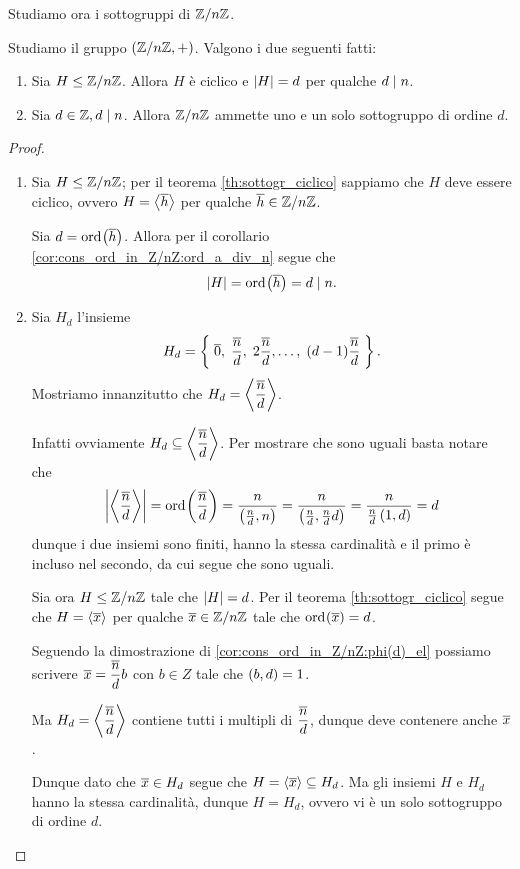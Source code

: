 Studiamo ora i sottogruppi di $\mathbb{Z}/n\mathbb{Z}$.

\begin{proposition}
     \label{prop:sgr_Z/nZ}
    Studiamo il gruppo $(\mathbb{Z}/n\mathbb{Z}, +)$. Valgono i due seguenti fatti:
    \begin{enumerate}[label={(\roman*)}, ref={\theproposition: (\roman*)}]
        \item \label{prop:sgr_Z/nZ:ciclico_ord_d} Sia $H \leq \mathbb{Z}/n\mathbb{Z}$. Allora $H$ è ciclico e $\lvert H\rvert = d$ per qualche $d \mid n$.
        \item \label{prop:sgr_Z/nZ:unosolo_ord_d} Sia $d \in \mathbb{Z}, d \mid n$. Allora $\mathbb{Z}/n\mathbb{Z}$ ammette uno e un solo sottogruppo di ordine $d$.
    \end{enumerate}
\end{proposition}

\begin{proof}
    \begin{enumerate} [label={(\roman*)}]
        \item Sia $H \leq \mathbb{Z}/n\mathbb{Z}$; per il teorema \ref{th:sottogr_ciclico} sappiamo che $H$ deve essere ciclico, ovvero $H = \cycl*{\eqclass h}$ per qualche $\eqclass h \in \Zmod n$.
        
        Sia $d = \ord{\eqclass h}$. Allora per il corollario \ref{cor:cons_ord_in_Z/nZ:ord_a_div_n} segue che \[
            \abs{H} = \ord{\eqclass h} = d \divides n.   
        \]
        \item Sia $H_d$ l'insieme \[
            H_d = \set{\eqclass 0,\; \frac{\eqclass n}{d},\; 2\frac{\eqclass n}{d}, \dots,\; (d-1)\frac{\eqclass n}{d}}.    
        \] Mostriamo innanzitutto che $H_d = \cycl*{\dfrac{\eqclass{n}}{d}}$.
        
        Infatti ovviamente $H_d \subseteq \cycl*{\dfrac{\eqclass n}{d}}$. Per mostrare che sono uguali basta notare che \[
            \abs*{\cycl*{\frac{\eqclass n}{d}}} = \ord{\frac{\eqclass n}{d}} = \frac{n}{\mcd{\frac{n}{d}}{n}} = \frac{n}{\mcd{\frac{n}{d}}{\frac{n}{d}d}} = \frac{n}{\frac{n}{d}\mcd{1}{d}} = d
        \] dunque i due insiemi sono finiti, hanno la stessa cardinalità e il primo è incluso nel secondo, da cui segue che sono uguali.

        Sia ora $H \leq \mathbb{Z}/n\mathbb{Z}$ tale che $\lvert H\rvert = d$. Per il teorema \ref{th:sottogr_ciclico} segue che $H = \cycl*{\eqclass x}$ per qualche $\eqclass x \in \Zmod n$ tale che $\ord{\eqclass x} = d$.

        Seguendo la dimostrazione di \ref{cor:cons_ord_in_Z/nZ:phi(d)_el} possiamo scrivere $\eqclass x = \dfrac{\eqclass n}{d}b$ con $b \in Z$ tale che $\left(b, d\right) = 1$.

        Ma $H_d = \cycl*{\dfrac{\eqclass n}{d}}$ contiene tutti i multipli di $\dfrac{\eqclass n}{d}$, dunque deve contenere anche $\eqclass x$.

        Dunque dato che $\eqclass x \in H_d$ segue che $H = \cycl*{\eqclass x} \subseteq H_d$. Ma gli insiemi $H$ e $H_d$ hanno la stessa cardinalità, dunque $H = H_d$, ovvero vi è un solo sottogruppo di ordine $d$. \qedhere
    \end{enumerate}
\end{proof}